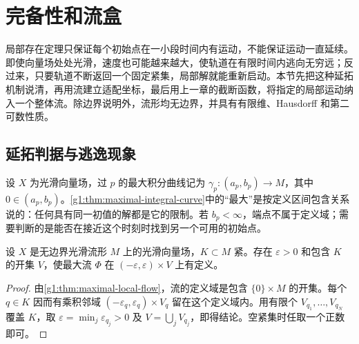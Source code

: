 
% 
% 

\section{完备性和流盒}
\label{g1:sec:1302}

局部存在定理只保证每个初始点在一小段时间内有运动，不能保证运动一直延续。即使向量场处处光滑，速度也可能越来越大，使轨道在有限时间内逃向无穷远；反过来，只要轨道不断返回一个固定紧集，局部解就能重新启动。本节先把这种延拓机制说清，再用流建立适配坐标，最后用上一章的截断函数，将指定的局部运动纳入一个整体流。除边界说明外，流形均无边界，并具有有限维、Hausdorff 和第二可数性质。

\subsection{延拓判据与逃逸现象}
\label{g1:subsec:1302:01}

设 \(X\) 为光滑向量场，过 \(p\) 的最大积分曲线记为 \(\gamma_p:(a_p,b_p)\to M\)，其中 \(0\in(a_p,b_p)\)。\cref{g1:thm:maximal-integral-curve}中的“最大”是按定义区间包含关系说的：任何具有同一初值的解都是它的限制。若 \(b_p<\infty\)，端点不属于定义域；需要判断的是能否在接近这个时刻时找到另一个可用的初始点。

\begin{lemma}
	\label{g1:lem:uniform-flow-time-compact}
	设 \(X\) 是无边界光滑流形 \(M\) 上的光滑向量场，\(K\subset M\) 紧。存在 \(\varepsilon>0\) 和包含 \(K\) 的开集 \(V\)，使最大流 \(\Phi\) 在 \((-\varepsilon,\varepsilon)\times V\) 上有定义。
\end{lemma}
\begin{proof}
	由\cref{g1:thm:maximal-local-flow}，流的定义域是包含 \(\{0\}\times M\) 的开集。每个 \(q\in K\) 因而有乘积邻域 \((-\varepsilon_q,\varepsilon_q)\times V_q\) 留在这个定义域内。用有限个 \(V_{q_1},\ldots,V_{q_N}\) 覆盖 \(K\)，取 \(\varepsilon=\min_j\varepsilon_{q_j}>0\) 及 \(V=\bigcup_jV_{q_j}\)，即得结论。空紧集时任取一个正数即可。
\end{proof}

